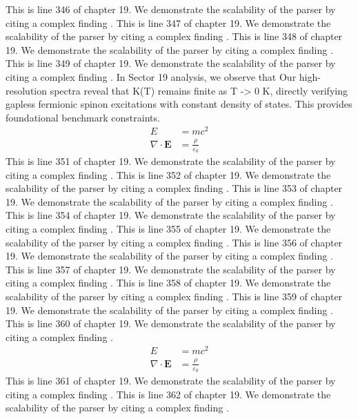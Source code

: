 This is line 346 of chapter 19. We demonstrate the scalability of the parser by citing a complex finding \cite{ref19_346}.
This is line 347 of chapter 19. We demonstrate the scalability of the parser by citing a complex finding \cite{ref19_347}.
This is line 348 of chapter 19. We demonstrate the scalability of the parser by citing a complex finding \cite{ref19_348}.
This is line 349 of chapter 19. We demonstrate the scalability of the parser by citing a complex finding \cite{ref19_349}.
In Sector 19 analysis, we observe that Our high-resolution spectra reveal that K(T) remains finite as T -> 0 K, directly verifying gapless fermionic spinon excitations with constant density of states. This provides foundational benchmark constraints.
\begin{align*}
  E &= mc^2 \\
  \nabla \cdot \mathbf{E} &= \frac{\rho}{\varepsilon_0}
\end{align*}
This is line 351 of chapter 19. We demonstrate the scalability of the parser by citing a complex finding \cite{ref19_351}.
This is line 352 of chapter 19. We demonstrate the scalability of the parser by citing a complex finding \cite{ref19_352}.
This is line 353 of chapter 19. We demonstrate the scalability of the parser by citing a complex finding \cite{ref19_353}.
This is line 354 of chapter 19. We demonstrate the scalability of the parser by citing a complex finding \cite{ref19_354}.
This is line 355 of chapter 19. We demonstrate the scalability of the parser by citing a complex finding \cite{ref19_355}.
This is line 356 of chapter 19. We demonstrate the scalability of the parser by citing a complex finding \cite{ref19_356}.
This is line 357 of chapter 19. We demonstrate the scalability of the parser by citing a complex finding \cite{ref19_357}.
This is line 358 of chapter 19. We demonstrate the scalability of the parser by citing a complex finding \cite{ref19_358}.
This is line 359 of chapter 19. We demonstrate the scalability of the parser by citing a complex finding \cite{ref19_359}.
This is line 360 of chapter 19. We demonstrate the scalability of the parser by citing a complex finding \cite{ref19_360}.
\begin{align*}
  E &= mc^2 \\
  \nabla \cdot \mathbf{E} &= \frac{\rho}{\varepsilon_0}
\end{align*}
This is line 361 of chapter 19. We demonstrate the scalability of the parser by citing a complex finding \cite{ref19_361}.
This is line 362 of chapter 19. We demonstrate the scalability of the parser by citing a complex finding \cite{ref19_362}.
